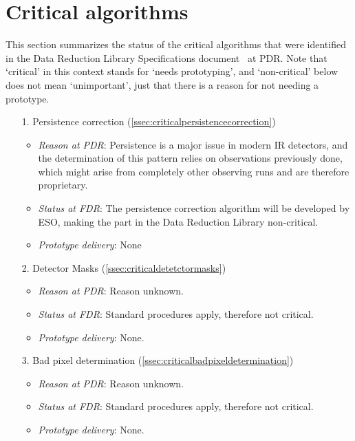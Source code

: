 \clearpage
\section{Critical algorithms}\label{sec:critical_algorithms}

This section summarizes the status of the critical algorithms that were identified in the Data Reduction Library Specifications document~\cite{DRLS} at PDR. Note that `critical' in this context stands for `needs prototyping', and `non-critical' below does not mean `unimportant', just that there is a reason for not needing a prototype.

\begin{enumerate}
    \item[1.] Persistence correction (\ref{ssec:criticalpersistencecorrection})
    \begin{itemize}
        \item \textit{Reason at PDR}: Persistence is a major issue in modern IR detectors, and the determination of this pattern relies on observations previously done, which might arise from completely other observing runs and are therefore proprietary.
        \item \textit{Status at FDR}: The persistence correction algorithm will be developed by ESO, making the part in the Data Reduction Library non-critical.
        \item \textit{Prototype delivery}: None
    \end{itemize}
    \item[2.] Detector Masks (\ref{ssec:criticaldetetctormasks})
    \begin{itemize}
        \item \textit{Reason at PDR}: Reason unknown.
        \item \textit{Status at FDR}: Standard procedures apply, therefore not critical.
        \item \textit{Prototype delivery}: None.
    \end{itemize}
    \item[3.] Bad pixel determination (\ref{ssec:criticalbadpixeldetermination})
    \begin{itemize}
        \item \textit{Reason at PDR}: Reason unknown.
        \item \textit{Status at FDR}: Standard procedures apply, therefore not critical.
        \item \textit{Prototype delivery}: None.
    \end{itemize}

\end{enumerate}
